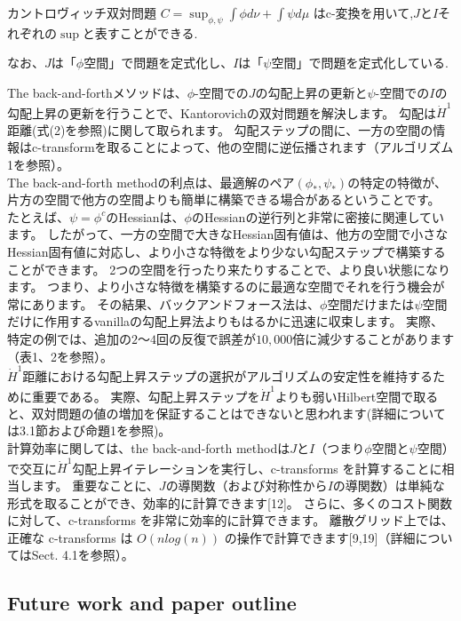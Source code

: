 \documentclass{jsarticle}
\theoremstyle{definition}
\begin{document}
カントロヴィッチ双対問題
$C = \sup_{\phi, \psi} \int \phi  d\nu + \int \psi  d\mu $
はc-変換を用いて,$J$と$I$それぞれの$\sup$と表すことができる.

なお、$J$は「$\phi$空間」で問題を定式化し、$I$は「$\psi$空間」で問題を定式化している.

The back-and-forthメソッドは、$\phi$-空間での$J$の勾配上昇の更新と$\psi$-空間での$I$の勾配上昇の更新を行うことで、Kantorovichの双対問題を解決します。 
勾配は$\dot{H}^1$距離(式(2)を参照)に関して取られます。
勾配ステップの間に、一方の空間の情報はc-transformを取ることによって、他の空間に逆伝播されます（アルゴリズム1を参照）。\\

The back-and-forth methodの利点は、最適解のペア$(\phi_*, \psi_*)$の特定の特徴が、片方の空間で他方の空間よりも簡単に構築できる場合があるということです。
たとえば、$\psi = \phi^c$のHessianは、$\phi$のHessianの逆行列と非常に密接に関連しています。
したがって、一方の空間で大きなHessian固有値は、他方の空間で小さなHessian固有値に対応し、より小さな特徴をより少ない勾配ステップで構築することができます。
2つの空間を行ったり来たりすることで、より良い状態になります。
つまり、より小さな特徴を構築するのに最適な空間でそれを行う機会が常にあります。
その結果、バックアンドフォース法は、$\phi$空間だけまたは$\psi$空間だけに作用するvanillaの勾配上昇法よりもはるかに迅速に収束します。
実際、特定の例では、追加の$2〜4$回の反復で誤差が$10,000$倍に減少することがあります（表1、2を参照）。\\


$\dot{H}^1$距離における勾配上昇ステップの選択がアルゴリズムの安定性を維持するために重要である。
実際、勾配上昇ステップを$\dot{H}^1$よりも弱いHilbert空間で取ると、双対問題の値の増加を保証することはできないと思われます(詳細については3.1節および命題1を参照)。\\

計算効率に関しては、the back-and-forth methodは$J$と$I$（つまり$\phi$空間と$\psi$空間）で交互に$\dot{H}^1$勾配上昇イテレーションを実行し、c-transforms を計算することに相当します。
重要なことに、$J$の導関数（および対称性から$I$の導関数）は単純な形式を取ることができ、効率的に計算できます[12]。
さらに、多くのコスト関数に対して、c-transforms を非常に効率的に計算できます。
離散グリッド上では、正確な c-transforms は $O(n log(n))$ の操作で計算できます[9,19]（詳細についてはSect. 4.1を参照）。


\subsection{Future work and paper outline}
\end{document}
